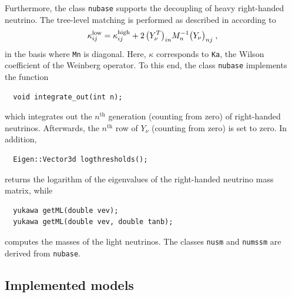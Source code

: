 \documentclass[preprint,12pt]{elsarticle}
\begin{document}
Furthermore, the class \texttt{nubase} supports the decoupling of heavy right-handed neutrino. The tree-level matching is performed as described in \cite{Antusch:2005gp} according to
\begin{equation}
    \kappa_{ij}^{\rm low} = \kappa_{ij}^{\rm high} + 2\, \bigl(Y_\nu^T\bigr)_{in} M_n^{-1} \bigl(Y_\nu\bigr)_{nj} \;,
\end{equation}
in the basis where \texttt{Mn} is diagonal. Here, $\kappa$ corresponds to \texttt{Ka}, the Wilson coefficient of the Weinberg operator.
To this end, the class \texttt{nubase} implements the function
\begin{lstlisting}
  void integrate_out(int n);
\end{lstlisting}
which integrates out the $n^\mathrm{th}$ generation (counting from zero) of right-handed neutrinos. 
Afterwards, the $n^\mathrm{th}$ row of $Y_\nu$ (counting from zero) is set to zero.
In addition, 
\begin{lstlisting}
  Eigen::Vector3d logthresholds();
\end{lstlisting}
returns the logarithm of the eigenvalues of the right-handed neutrino mass matrix, while
\begin{lstlisting}
  yukawa getML(double vev);
  yukawa getML(double vev, double tanb);
\end{lstlisting}
computes the masses of the light neutrinos.
The classes \texttt{nusm} and \texttt{numssm} are derived from \texttt{nubase}.

\subsection{\label{sec::models} Implemented models}
\end{document}
